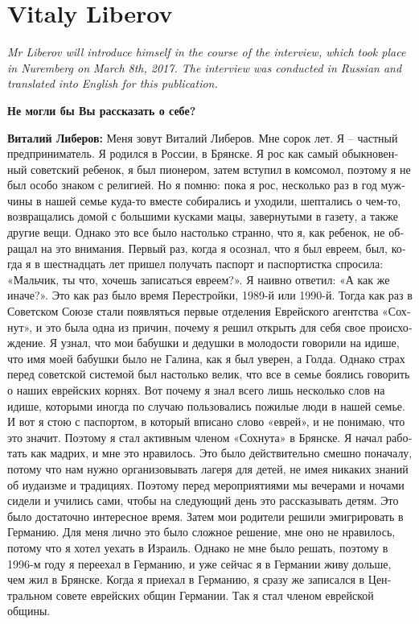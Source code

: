 \section{Vitaly Liberov}

\textit{Mr Liberov will introduce himself in the course of the interview, which took place in Nuremberg on March 8th, 2017. The interview was conducted in Russian and translated into English for this publication.}\par
\vspace*{2em}
\begin{otherlanguage}{russian}
	\textbf{Не могли бы Вы рассказать о себе?} 
	
	\textbf{Виталий Либеров:} Меня зовут Виталий Либеров. Мне сорок лет. Я – частный предприниматель. Я родился в России, в Брянске. Я рос как самый обыкновенный советский ребенок, я был пионером, затем вступил в комсомол, поэтому я не был особо знаком с религией. Но я помню: пока я рос, несколько раз в год мужчины в нашей семье куда-то вместе собирались и уходили, шептались о чем-то, возвращались домой с большими кусками мацы, завернутыми в газету, а также другие вещи. Однако это все было настолько странно, что я, как ребенок, не обращал на это внимания. Первый раз, когда я осознал, что я был евреем, был, когда я в шестнадцать лет пришел получать паспорт и паспортистка спросила: «Мальчик, ты что, хочешь записаться евреем?». Я наивно ответил: «А как же иначе?». Это как раз было время Перестройки, 1989-й или 1990-й. Тогда как раз в Советском Союзе стали появляться первые отделения Еврейского агентства «Сохнут», и это была одна из причин, почему я решил открыть для себя свое происхождение. Я узнал, что мои бабушки и дедушки в молодости говорили на идише, что имя моей бабушки было не Галина, как я был уверен, а Голда. Однако страх перед советской системой был настолько велик, что все в семье боялись говорить о наших еврейских корнях. Вот почему я знал всего лишь несколько слов на идише, которыми иногда по случаю пользовались пожилые люди в нашей семье. И вот я стою с паспортом, в который вписано слово «еврей», и не понимаю, что это значит. Поэтому я стал активным членом «Сохнута» в Брянске. Я начал работать как мадрих, и мне это нравилось. Это было действительно смешно поначалу, потому что нам нужно организовывать лагеря для детей, не имея никаких знаний об иудаизме и традициях. Поэтому перед мероприятиями мы вечерами и ночами сидели и учились сами, чтобы на следующий день это рассказывать детям. Это было достаточно интересное время. Затем мои родители решили эмигрировать в Германию. Для меня лично это было сложное решение, мне оно не нравилось, потому что я хотел уехать в Израиль. Однако не мне было решать, поэтому в 1996-м году я переехал в Германию, и уже сейчас я в Германии живу дольше, чем жил в Брянске. Когда я приехал в Германию, я сразу же записался в Центральном совете еврейских общин Германии. Так я стал членом еврейской общины. 
	

\end{otherlanguage}
